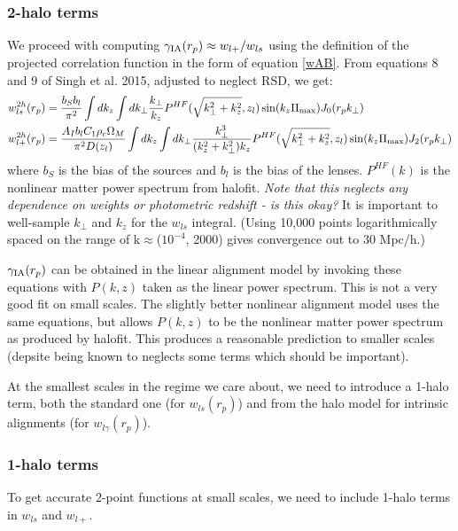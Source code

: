 \documentclass[onecolumn,amsmath,aps,fleqn, superscriptaddress]{revtex4}
\begin{document}
\subsubsection*{2-halo terms}
We proceed with computing $\gamma_{\rm IA}(r_p) \approx w_{l+} / w_{ls}$ using the definition of the projected correlation function in the form of equation \ref{wAB}. From equations 8 and 9 of Singh et al. 2015, adjusted to neglect RSD, we get:
\begin{align}
w_{ls}^{2h}(r_p) &= \frac{b_S b_l}{\pi^2} \int dk_z  \int dk_\perp  \frac{k_\perp}{k_z} P^{HF}(\sqrt{k_\perp^2 + k_z^2}, z_l) \sin(k_z \Pi_{\rm max}) J_0(r_p k_\perp) \nonumber \\
w_{l+}^{2h}(r_p) &= \frac{A_I b_l C_1 \rho_c \Omega_M}{\pi^2 D(z_l)} \int dk_z  \int dk_\perp  \frac{k_\perp^3 }{(k_z^2 + k_\perp^2)k_z} P^{HF}(\sqrt{k_\perp^2 + k_z^2}, z_l) \sin(k_z \Pi_{\rm max}) J_2(r_p k_\perp)
\label{ws}
\end{align}
where $b_S$ is the bias of the sources and $b_l$ is the bias of the lenses. $P^{HF}(k)$ is the nonlinear matter power spectrum from halofit. {\it Note that this neglects any dependence on weights or photometric redshift - is this okay?} It is important to well-sample $k_\perp$ and $k_z$ for the $w_{ls}$ integral. (Using 10,000 points logarithmically spaced on the range of k$\approx$($10^{-4}$, 2000) gives convergence out to $30$ Mpc/h.)

$\gamma_{\rm IA}(r_p)$ can be obtained in the linear alignment model by invoking these equations with $P(k,z)$ taken as the linear power spectrum. This is not a very good fit on small scales. The slightly better nonlinear alignment model uses the same equations, but allows $P(k,z)$ to be the nonlinear matter power spectrum as produced by halofit. This produces a reasonable prediction to smaller scales (depsite being known to neglects some terms which should be important). 

At the smallest scales in the regime we care about, we need to introduce a 1-halo term, both the standard one (for $w_{ls}(r_p)$) and from the halo model for intrinsic alignments (for $w_{l\gamma}(r_p)$). 

\subsubsection*{1-halo terms}
To get accurate 2-point functions at small scales, we need to include 1-halo terms in $w_{ls}$ and $w_{l+}$. 
\end{document}
